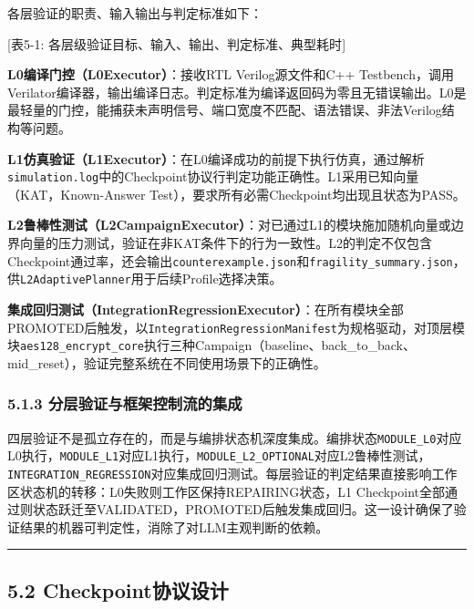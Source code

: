 各层验证的职责、输入输出与判定标准如下：

{[}表5-1: 各层级验证目标、输入、输出、判定标准、典型耗时{]}

\textbf{L0编译门控（L0Executor）}：接收RTL Verilog源文件和C++
Testbench，调用Verilator编译器，输出编译日志。判定标准为编译返回码为零且无错误输出。L0是最轻量的门控，能捕获未声明信号、端口宽度不匹配、语法错误、非法Verilog结构等问题。

\textbf{L1仿真验证（L1Executor）}：在L0编译成功的前提下执行仿真，通过解析\texttt{simulation.log}中的Checkpoint协议行判定功能正确性。L1采用已知向量（KAT，Known-Answer
Test），要求所有必需Checkpoint均出现且状态为PASS。

\textbf{L2鲁棒性测试（L2CampaignExecutor）}：对已通过L1的模块施加随机向量或边界向量的压力测试，验证在非KAT条件下的行为一致性。L2的判定不仅包含Checkpoint通过率，还会输出\texttt{counterexample.json}和\texttt{fragility\_summary.json}，供\texttt{L2AdaptivePlanner}用于后续Profile选择决策。

\textbf{集成回归测试（IntegrationRegressionExecutor）}：在所有模块全部PROMOTED后触发，以\texttt{IntegrationRegressionManifest}为规格驱动，对顶层模块\texttt{aes128\_encrypt\_core}执行三种Campaign（baseline、back\_to\_back、mid\_reset），验证完整系统在不同使用场景下的正确性。

\subsubsection{5.1.3
分层验证与框架控制流的集成}\label{ux5206ux5c42ux9a8cux8bc1ux4e0eux6846ux67b6ux63a7ux5236ux6d41ux7684ux96c6ux6210}

四层验证不是孤立存在的，而是与编排状态机深度集成。编排状态\texttt{MODULE\_L0}对应L0执行，\texttt{MODULE\_L1}对应L1执行，\texttt{MODULE\_L2\_OPTIONAL}对应L2鲁棒性测试，\texttt{INTEGRATION\_REGRESSION}对应集成回归测试。每层验证的判定结果直接影响工作区状态机的转移：L0失败则工作区保持REPAIRING状态，L1
Checkpoint全部通过则状态跃迁至VALIDATED，PROMOTED后触发集成回归。这一设计确保了验证结果的机器可判定性，消除了对LLM主观判断的依赖。

\begin{center}\rule{0.5\linewidth}{0.5pt}\end{center}

\subsection{5.2
Checkpoint协议设计}\label{checkpointux534fux8baeux8bbeux8ba1}

